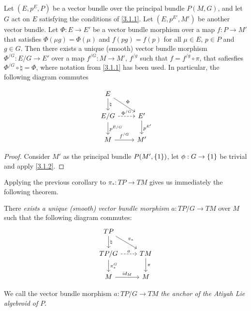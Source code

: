 \begin{corollary}
Let $(E, p^E, P)$ be a vector bundle over the principal bundle $P(M, G)$, and let $G$ act on $E$ satisfying the conditions of \ref{3.1.1}. Let $(E, p^{E'}, M')$ be another vector bundle. Let $\Phi: E \to E'$ be a vector bundle morphism over a map $f: P \to M'$ that satisfies $\Phi(\mu g) = \Phi(\mu)$ and $f(pg) = f(p)$ for all $\mu \in E$, $p \in P$ and $g \in G$. Then there exists a unique (smooth) vector bundle morphism $\Phi^{/G}: E/G \to E'$ over a map $f^{/G}: M \to M'$, $f^{/g}$ such that $f = f^{/g} \circ \pi$, that safiesfies $\Phi^{/G} \circ \natural = \Phi$, where notation from \ref{3.1.1} has been used. In particular, the following diagram commutes

\begin{equation} \label{anchorDiagram}
    \begin{tikzcd}
    E \arrow[]{d}{\natural} \arrow[]{dr}{\Phi}& \\
    E/G \arrow[dashed]{r}{\Phi^{/G}} \arrow[]{d}{p^{E/G}}& E' \arrow[]{d}{p^{E'}} \\
    M \arrow[]{r}{f^{/G}} & M'
    \end{tikzcd}
\end{equation}
\end{corollary}

\begin{proof}
Consider $M'$ as the principal bundle $P(M', \left\{ 1 \right\})$, let $\phi:G \to \set{1}$ be trivial and apply \ref{3.1.2}.
\end{proof}

Applying the previous corollary to $\pi_*: TP \to TM$ gives us immediately the following theorem.

\begin{theorem}\label{anchorAtiyah}
There \emph{exists a unique (smooth) vector bundle morphism} $a: TP/G \to TM$ over $M$ such that the following diagram commutes:
\begin{equation} \label{anchorDiagram}
    \begin{tikzcd}
    TP \arrow[]{d}{\natural} \arrow[]{dr}{\pi_*}& \\
    TP/G \arrow[dashed]{r}{a} \arrow[]{d}{\pi_*^G}& TM \arrow[]{d}{\pi} \\
    M \arrow[]{r}{id_M} & M
    \end{tikzcd}
\end{equation}


We call the vector bundle morphism $a:TP/G \to TM$ \emph{the anchor of the Atiyah Lie algebroid of $P$}.
\end{theorem}

